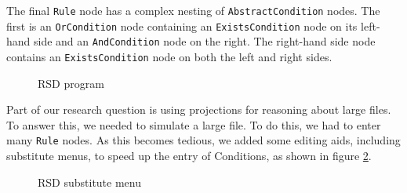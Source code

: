 The final \texttt{Rule} node has a complex nesting of \texttt{AbstractCondition} nodes.
The first is an \texttt{OrCondition} node containing an \texttt{ExistsCondition} node on its left-hand side and an \texttt{AndCondition} node on the right.
The right-hand side node contains an \texttt{ExistsCondition} node on both the left and right sides. 

\begin{figure}[h]
    \centering
    \caption{RSD program}
    \label{fig:RSDProgram}
\end{figure}

\newpage

Part of our research question is using projections for reasoning about large files.
To answer this, we needed to simulate a large file.
To do this, we had to enter many \texttt{Rule} nodes.
As this becomes tedious, we added some editing aids, including substitute menus, to speed up the entry of Conditions, as shown in figure \ref{fig:RSDSubstituteMenu}.

\begin{figure}[h]
    \centering
    \caption{RSD substitute menu}
    \label{fig:RSDSubstituteMenu}
\end{figure}

